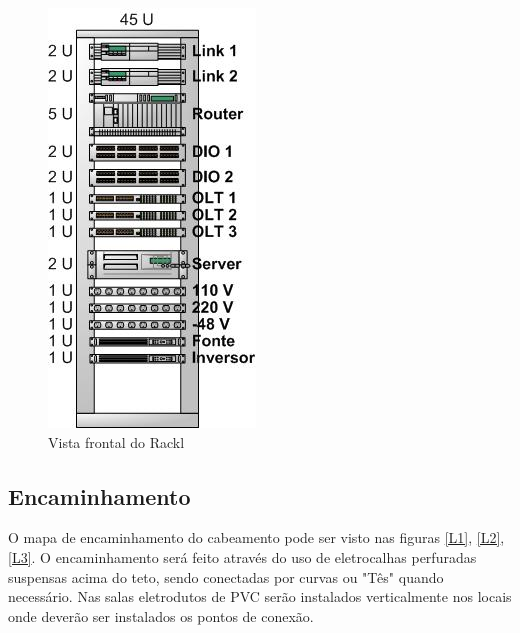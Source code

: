 \documentclass[	DIV=calc,%
							paper=a4,%
							fontsize=12pt,%
							onecolumn]{scrartcl}	 					%
\begin{document}
\begin{figure}
\centering
\includegraphics[height=\textwidth]{rack}
\caption{Vista frontal do Rackl}
\label{rack}
\end{figure}




\subsection{Encaminhamento}
O mapa de encaminhamento do cabeamento pode ser visto nas figuras \ref{L1}, \ref{L2}, \ref{L3}. O encaminhamento será feito através do uso de eletrocalhas perfuradas suspensas acima do teto, sendo conectadas por curvas ou "Tês" quando necessário.
Nas salas eletrodutos de PVC serão instalados verticalmente nos locais onde deverão ser instalados os pontos de conexão.
\end{document}

